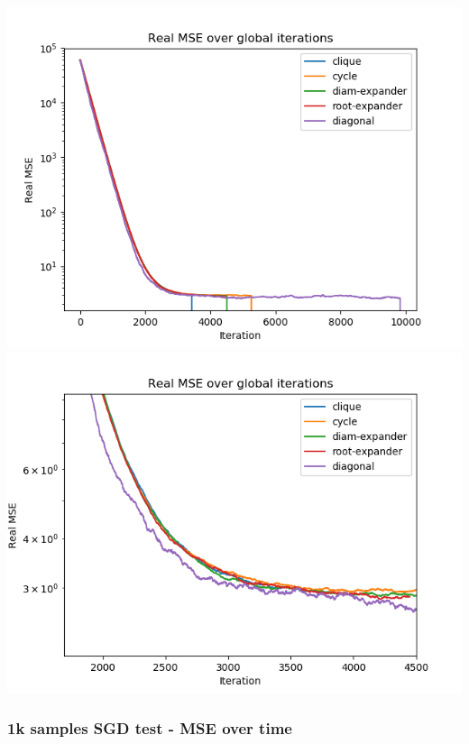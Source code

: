 \documentclass[11pt]{article}
\makeatletter
\def\maxwidth{\ifdim\Gin@nat@width>\linewidth\linewidth
    \else\Gin@nat@width\fi}
\let\Oldincludegraphics\includegraphics
\renewcommand{\includegraphics}[1]{\Oldincludegraphics[width=.8\maxwidth]{#1}}
\makeatother
\begin{document}
\includegraphics{media/img/tests/test_003_1ksamples_stochastic/2_real-mse_iter.png}
\includegraphics{media/img/tests/test_003_1ksamples_stochastic/2_real-mse_iter_zoom.png}

\subsubsection{1k samples SGD test - MSE over
time}\label{k-samples-sgd-test---mse-over-time}
\end{document}
